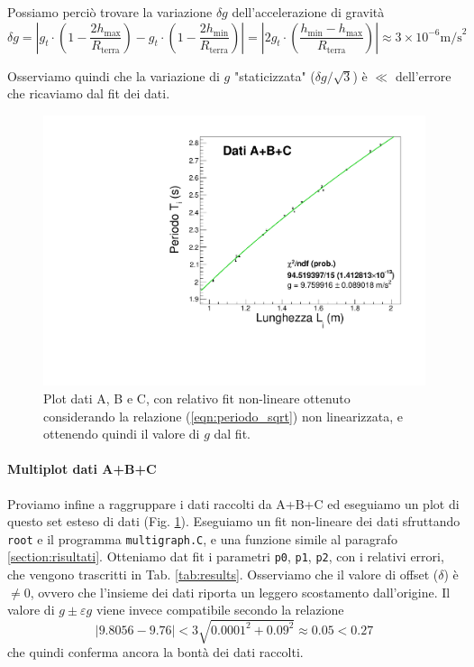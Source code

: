 \documentclass[italian, a4paper, 10pt, twocolumn]{../../style/lab_unige}
\newcommand{\reftab}[1]{Tab. {\ref{#1}}}%
\newcommand{\reffig}[1]{Fig. {\ref{#1}}}%
\newcommand{\refeqn}[1]{({\ref{#1})}}%
\begin{document}
  Possiamo perciò trovare la variazione $\delta g$ dell'accelerazione di gravità
  \begin{dmath*}
  \delta g=\left|g_{t}\cdot\left(1-\frac{2h_{\text{max}}}{R_{\text{terra}}}\right)-g_{t}\cdot\left(1-\frac{2h_{\text{min}}}{R_{\text{terra}}}\right)\right|=
  \left|2g_{t}\cdot\left(\frac{h_{\text{min}}-h_{\text{max}}}{R_{\text{terra}}}\right)\right|
  \approx3\times10^{-6} \text{m/s}^{2}
  \end{dmath*}

  Osserviamo quindi che la variazione di $g$ "staticizzata" ($\delta g / \sqrt{3}$) è $\ll$ dell'errore che ricaviamo dal fit dei dati.\\


  \begin{figure}[t]
    \includegraphics[width=\linewidth]{multigraph_set_final_v2.pdf}
    \caption{Plot dati A, B e C, con relativo fit non-lineare ottenuto considerando la relazione \refeqn{eqn:periodo_sqrt}
    non linearizzata, e ottenendo quindi il valore di $g$ dal fit.}
    \label{fig:multigraph_all_data}
  \end{figure}
  \paragraph{Multiplot dati A+B+C}\label{par:multiplot}
  Proviamo infine a raggruppare i dati raccolti da A+B+C ed eseguiamo un plot di questo set esteso di dati
  (\reffig{fig:multigraph_all_data}).
  Eseguiamo un fit non-lineare dei dati sfruttando \verb|root| e il programma \verb|multigraph.C|, e una 
  funzione simile al paragrafo \ref{section:risultati}.
  Otteniamo dat fit i parametri \verb|p0|, \verb|p1|, \verb|p2|, con i relativi errori, che vengono trascritti in 
  \reftab{tab:results}.\@
  Osserviamo che il valore di offset ($\delta$) è $\neq0$, ovvero che l'insieme dei dati riporta un leggero scostamento 
  dall'origine. Il valore di $g\pm\varepsilon g$ viene invece compatibile secondo la relazione
  \[\left|9.8056-9.76\right|<3\sqrt{0.0001^{2}+0.09^{2}}\approx0.05<0.27\]
  che quindi conferma ancora la bontà dei dati raccolti.
  
  
  
\end{document}
